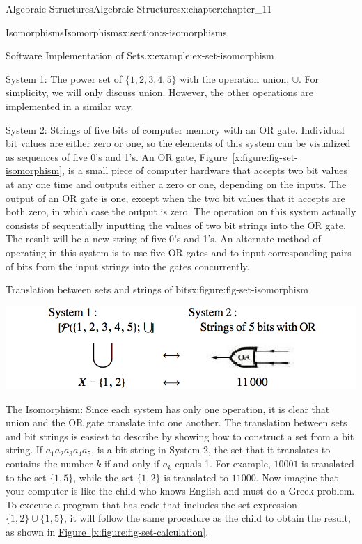 \documentclass[oneside,10pt,]{book}
\newcommand{\xreffont}{\relax}
\numberwithin{equation}{section}
\begin{document}
\begin{chapterptx}{Algebraic Structures}{}{Algebraic Structures}{}{}{x:chapter:chapter_11}
\begin{sectionptx}{Isomorphisms}{}{Isomorphisms}{}{}{x:section:s-isomorphisms}
\begin{introduction}{}
\begin{example}{Software Implementation of Sets.}{x:example:ex-set-isomorphism}
\par
System 1: The power set of \(\{1, 2, 3, 4, 5\}\) with the operation union, \(\cup\). For simplicity, we will only discuss union. However, the other operations are implemented in a similar way.%
\par
System 2: Strings of five bits of computer memory with an OR gate. Individual bit values are either zero or one, so the elements of this system can be visualized as sequences of five 0's and 1's. An OR gate, \hyperref[x:figure:fig-set-isomorphism]{Figure~{\xreffont\ref{x:figure:fig-set-isomorphism}}}, is a small piece of computer hardware that accepts two bit values at any one time and outputs either a zero or one, depending on the inputs. The output of an OR gate is one, except when the two bit values that it accepts are both zero, in which case the output is zero. The operation on this system actually consists of sequentially inputting the values of two bit strings into the OR gate. The result will be a new string of five 0's and 1's. An alternate method of operating in this system is to use five OR gates and to input corresponding pairs of bits from the input strings into the gates concurrently.%
\begin{figureptx}{Translation between sets and strings of bits}{x:figure:fig-set-isomorphism}{}%
\begin{image}{0.15}{0.7}{0.15}%
\includegraphics[width=\linewidth]{images/fig-set-isomorphism.png}
\end{image}%
\tcblower
\end{figureptx}%
The Isomorphism: Since each system has only one operation, it is clear that union and the OR gate translate into one another. The translation between sets and bit strings is easiest to describe by showing how to construct a set from a bit string. If \(a_1a_2a_3a_4a_5\), is a bit string in System 2, the set that it translates to contains the number \(k\) if and only if \(a_k\) equals 1. For example, \(10001\) is translated to the set \(\{1, 5\}\), while the set \(\{1, 2\}\) is translated to \(11000.\) Now imagine that your computer is like the child who knows English and must do a Greek problem. To execute a program that has code that includes the set expression \(\{1, 2\} \cup  \{1, 5\}\), it will follow the same procedure as the child to obtain the result, as shown in \hyperref[x:figure:fig-set-calculation]{Figure~{\xreffont\ref{x:figure:fig-set-calculation}}}.%

\end{example}
\end{introduction}
\end{sectionptx}
\end{chapterptx}
\end{document}
